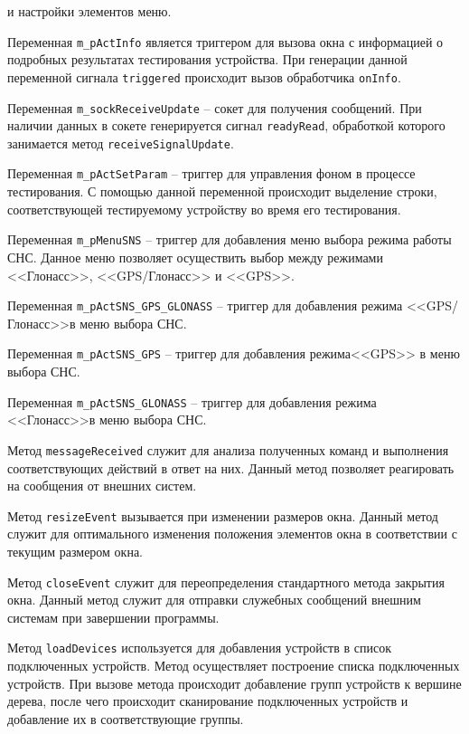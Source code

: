 \begin{enum}
		и настройки элементов меню.
	\item Переменная \texttt{m\_pActInfo} является триггером для вызова окна с информацией о подробных результатах
		тестирования устройства. При генерации данной переменной сигнала \texttt{triggered} происходит вызов
		обработчика \texttt{onInfo}.
	\item Переменная \texttt{m\_sockReceiveUpdate} -- сокет для получения сообщений. При наличии данных в сокете
		генерируется сигнал \texttt{readyRead}, обработкой которого занимается метод
		\texttt{receiveSignalUpdate}.
	\item Переменная \texttt{m\_pActSetParam} -- триггер для управления фоном в процессе тестирования. С помощью
		данной переменной происходит выделение строки, соответствующей тестируемому устройству во время его
		тестирования.
	\item Переменная \texttt{m\_pMenuSNS} -- триггер для добавления меню выбора режима работы СНС. Данное меню
		позволяет осуществить выбор между режимами <<Глонасс>>, <<GPS/Глонасс>> и <<GPS>>.
	\item Переменная \texttt{m\_pActSNS\_GPS\_GLONASS} -- триггер для добавления режима <<GPS/Глонасс>>в меню выбора
		СНС.
	\item Переменная \texttt{m\_pActSNS\_GPS} -- триггер для добавления режима\break <<GPS>> в меню выбора СНС.
	\item Переменная \texttt{m\_pActSNS\_GLONASS} -- триггер для добавления режима <<Глонасс>>в меню выбора СНС.

	\item Метод \texttt{messageReceived} служит для анализа полученных команд и выполнения соответствующих действий
		в ответ на них. Данный метод позволяет реагировать на сообщения от внешних систем.

	\item Метод \texttt{resizeEvent} вызывается при изменении размеров окна. Данный метод служит для оптимального
		изменения положения элементов окна в соответствии с текущим размером окна.

	\item Метод \texttt{closeEvent} служит для переопределения стандартного метода закрытия окна. Данный метод
		служит для отправки служебных сообщений внешним системам при завершении программы.

	\item Метод \texttt{loadDevices} используется для добавления устройств в список подключенных устройств. Метод
		осуществляет построение списка подключенных устройств. При вызове метода происходит добавление
		групп\break
		устройств к вершине дерева, после чего происходит сканирование подключенных устройств и добавление их в
		соответствующие группы.


\end{enum}

